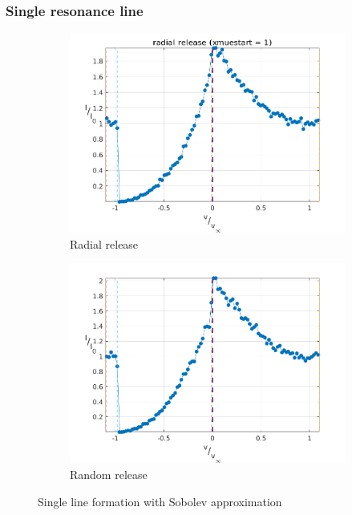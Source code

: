 \documentclass[../main/main.tex]{subfiles}
\begin{document}
\subsubsection{Single resonance line}
\begin{figure}[!htbp]
\centering
\hspace*{-0.5in}
\begin{subfigure}{.6\textwidth}
\includegraphics[width=1\textwidth]{../../two_resonance_lines/figures/solution_radial_release.png}
\caption{Radial release}
\end{subfigure}%
\begin{subfigure}{.6\textwidth}
\includegraphics[width=1\textwidth]{../../two_resonance_lines/figures/solution_random_release.png}
\caption{Random release}
\end{subfigure}
\caption{Single line formation with Sobolev approximation}
\label{PCyg_mu_eq_1_test}
\end{figure}
\end{document}
